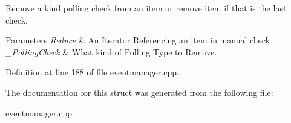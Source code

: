 Remove a kind polling check from an item or remove item if that is the last check. 


\begin{DoxyParams}{Parameters}
{\em Reduce} & An Iterator Referencing an item in manual check \\
\hline
{\em \_\-PollingCheck} & What kind of Polling Type to Remove. \\
\hline
\end{DoxyParams}


Definition at line 188 of file eventmanager.cpp.



The documentation for this struct was generated from the following file:\begin{DoxyCompactItemize}
\item 
eventmanager.cpp\end{DoxyCompactItemize}
